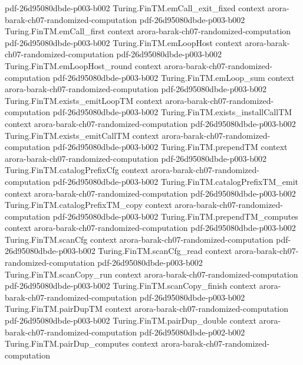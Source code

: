 \begin{theorem}
  {pdf-26d95080dbde-p003-b002}
\proofstep
  {Turing.FinTM.emCall_exit_fixed}
  {context}
  {arora-barak-ch07-randomized-computation}
  {pdf-26d95080dbde-p003-b002}
\proofstep
  {Turing.FinTM.emCall_first}
  {context}
  {arora-barak-ch07-randomized-computation}
  {pdf-26d95080dbde-p003-b002}
\proofstep
  {Turing.FinTM.emLoopHost}
  {context}
  {arora-barak-ch07-randomized-computation}
  {pdf-26d95080dbde-p003-b002}
\proofstep
  {Turing.FinTM.emLoopHost_round}
  {context}
  {arora-barak-ch07-randomized-computation}
  {pdf-26d95080dbde-p003-b002}
\proofstep
  {Turing.FinTM.emLoop_sum}
  {context}
  {arora-barak-ch07-randomized-computation}
  {pdf-26d95080dbde-p003-b002}
\proofstep
  {Turing.FinTM.exists_emitLoopTM}
  {context}
  {arora-barak-ch07-randomized-computation}
  {pdf-26d95080dbde-p003-b002}
\proofstep
  {Turing.FinTM.exists_installCallTM}
  {context}
  {arora-barak-ch07-randomized-computation}
  {pdf-26d95080dbde-p003-b002}
\proofstep
  {Turing.FinTM.exists_emitCallTM}
  {context}
  {arora-barak-ch07-randomized-computation}
  {pdf-26d95080dbde-p003-b002}
\proofstep
  {Turing.FinTM.prependTM}
  {context}
  {arora-barak-ch07-randomized-computation}
  {pdf-26d95080dbde-p003-b002}
\proofstep
  {Turing.FinTM.catalogPrefixCfg}
  {context}
  {arora-barak-ch07-randomized-computation}
  {pdf-26d95080dbde-p003-b002}
\proofstep
  {Turing.FinTM.catalogPrefixTM_emit}
  {context}
  {arora-barak-ch07-randomized-computation}
  {pdf-26d95080dbde-p003-b002}
\proofstep
  {Turing.FinTM.catalogPrefixTM_copy}
  {context}
  {arora-barak-ch07-randomized-computation}
  {pdf-26d95080dbde-p003-b002}
\proofstep
  {Turing.FinTM.prependTM_computes}
  {context}
  {arora-barak-ch07-randomized-computation}
  {pdf-26d95080dbde-p003-b002}
\proofstep
  {Turing.FinTM.scanCfg}
  {context}
  {arora-barak-ch07-randomized-computation}
  {pdf-26d95080dbde-p003-b002}
\proofstep
  {Turing.FinTM.scanCfg_read}
  {context}
  {arora-barak-ch07-randomized-computation}
  {pdf-26d95080dbde-p003-b002}
\proofstep
  {Turing.FinTM.scanCopy_run}
  {context}
  {arora-barak-ch07-randomized-computation}
  {pdf-26d95080dbde-p003-b002}
\proofstep
  {Turing.FinTM.scanCopy_finish}
  {context}
  {arora-barak-ch07-randomized-computation}
  {pdf-26d95080dbde-p003-b002}
\proofstep
  {Turing.FinTM.pairDupTM}
  {context}
  {arora-barak-ch07-randomized-computation}
  {pdf-26d95080dbde-p003-b002}
\proofstep
  {Turing.FinTM.pairDup_double}
  {context}
  {arora-barak-ch07-randomized-computation}
  {pdf-26d95080dbde-p002-b002}
\proofstep
  {Turing.FinTM.pairDup_computes}
  {context}
  {arora-barak-ch07-randomized-computation}

\end{theorem}
